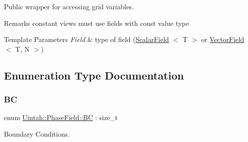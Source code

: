 Public wrapper for accessing grid variables. 

\begin{DoxyRemark}{Remarks}
constant views must use fields with const value type
\end{DoxyRemark}

\begin{DoxyTemplParams}{Template Parameters}
{\em Field} & type of field (\hyperlink{structUintah_1_1PhaseField_1_1ScalarField}{Scalar\+Field} $<$ T $>$ or \hyperlink{structUintah_1_1PhaseField_1_1VectorField}{Vector\+Field} $<$ T, N $>$) \\
\hline
\end{DoxyTemplParams}


\subsection{Enumeration Type Documentation}
\mbox{\label{namespaceUintah_1_1PhaseField_a148fba372aa3be96fd6eede7a2fa10b5}} 
\subsubsection{\texorpdfstring{BC}{BC}}
{\footnotesize\ttfamily enum \hyperlink{namespaceUintah_1_1PhaseField_a148fba372aa3be96fd6eede7a2fa10b5}{Uintah\+::\+Phase\+Field\+::\+BC} \+: size\+\_\+t\hspace{0.3cm}{\ttfamily [strong]}}



Boundary Conditions. 

